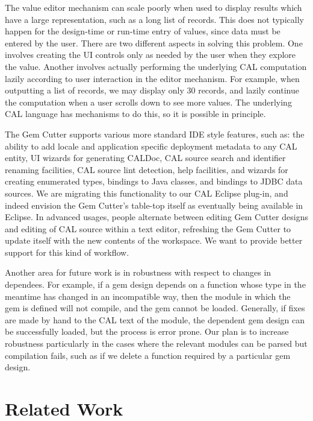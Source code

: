 \documentclass[preprint]{sigplanconf}
\begin{document}
The value editor mechanism can scale poorly when used to display results
which have a large representation, such as a long list of records.
This does not typically happen for the design-time or run-time entry of
values, since data must be entered by the user. There are two different aspects
in solving this problem. One involves creating the UI controls only as needed
by the user when they explore the value. Another involves actually performing 
the underlying CAL computation lazily according to user interaction in the editor mechanism.
For example, when outputting a list of records, we may display only 30 records,
and lazily continue the computation when a user scrolls down to see more values.
The underlying CAL language has mechanisms to do this, so it is possible in principle.

The Gem Cutter supports various more standard IDE style features, such
as: the ability to add locale and application specific deployment
metadata to any CAL entity, UI wizards for generating CALDoc, CAL
source search and identifier renaming facilities, CAL source lint
detection, help facilities, and wizards for creating enumerated types,
bindings to Java classes, and bindings to JDBC data sources. We are
migrating this functionality to our CAL Eclipse plug-in, and indeed
envision the Gem Cutter's table-top itself as eventually being
available in Eclipse. In advanced usages, people alternate between editing 
Gem Cutter designs and editing of CAL source within a text editor,
refreshing the Gem Cutter to update itself with the new
contents of the workspace. We want to provide better support for this
kind of workflow.

Another area for future work is in robustness with respect to changes
in dependees. For example, if a gem design depends on a function whose
type in the meantime has changed in an incompatible way, then the
module in which the gem is defined will not compile, and the gem
cannot be loaded. Generally, if fixes are made by hand to the CAL text
of the module, the dependent gem design can be successfully loaded,
but the process is error prone. Our plan is to increase robustness
particularly in the cases where the relevant modules can be parsed but
compilation fails, such as if we delete a function required by a
particular gem design.

\section{Related Work}
\label{sec:related}
\end{document}
